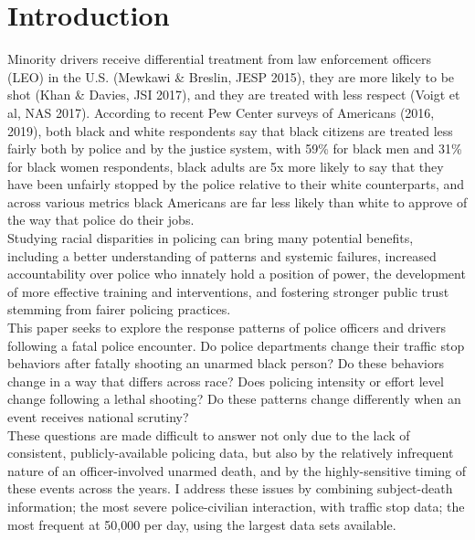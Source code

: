 \documentclass[12pt,a4paper]{article}
\begin{document}
\section{Introduction} 
Minority drivers receive differential treatment from law enforcement officers (LEO) in the U.S. (Mewkawi \& Breslin, JESP 2015), they are more likely to be shot (Khan \& Davies, JSI 2017), and they are treated with less respect (Voigt et al, NAS 2017). According to recent Pew Center surveys of Americans (2016, 2019), both black and white respondents say that black citizens are treated less fairly both by police and by the justice system, with 59\% for black men and 31\% for black women respondents, black adults are 5x more likely to say that they have been unfairly stopped by the police relative to their white counterparts, and across various metrics black Americans are far less likely than white to approve of the way that police do their jobs. \\

Studying racial disparities in policing can bring many potential benefits, including a better understanding of patterns and systemic failures, increased accountability over police who innately hold a position of power, the development of more effective training and interventions, and fostering stronger public trust stemming from fairer policing practices. \\

This paper seeks to explore the response patterns of police officers and drivers following a fatal police encounter. Do police departments change their traffic stop behaviors after fatally shooting an unarmed black person? Do these behaviors change in a way that differs across race? Does policing intensity or effort level change following a lethal shooting? Do these patterns change differently when an event receives national scrutiny? \\ 

These questions are made difficult to answer not only due to the lack of consistent, publicly-available policing data, but also by the relatively infrequent nature of an officer-involved unarmed death, and by the highly-sensitive timing of these events across the years. I address these issues by combining subject-death information; the most severe police-civilian interaction, with traffic stop data; the most frequent at 50,000 per day, using the largest data sets available. \\
\end{document}
